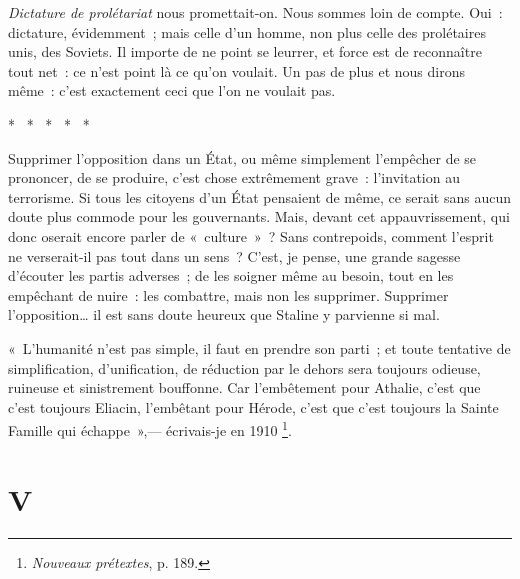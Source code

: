 \documentclass[french,twoside]{book} %
\begin{document}
\noindent \emph{Dictature de prolétariat} nous promettait-on. Nous sommes loin de compte. Oui : dictature, évidemment ; mais celle d’un homme, non plus celle des prolétaires unis, des Soviets. Il importe de ne point se leurrer, et force est de reconnaître tout net : ce n’est point là ce qu’on voulait. Un pas de plus et nous dirons même : c’est exactement ceci que l’on ne voulait pas.\par

\begin{center}
\noindent \centerline{*  *  *  *  *}\par
\end{center}

\noindent Supprimer l’opposition dans un État, ou même simplement l’empêcher de se prononcer, de se produire, c’est chose extrêmement grave : l’invitation au terrorisme. Si tous les citoyens d’un État pensaient de même, ce serait sans aucun doute plus commode pour les gouvernants. Mais, devant cet appauvrissement, qui donc oserait encore parler de « culture » ? Sans contrepoids, comment l’esprit ne verserait-il pas tout dans un sens ? C’est, je pense, une grande sagesse d’écouter les partis adverses ; de les soigner même au besoin, tout en les empêchant de nuire : les combattre, mais non les supprimer. Supprimer l’opposition… il est sans doute heureux que Staline y parvienne si mal.\par
« L’humanité n’est pas simple, il faut en prendre son parti ; et toute tentative de simplification, d’unification, de réduction par le dehors sera toujours odieuse, ruineuse et sinistrement bouffonne. Car l’embêtement pour Athalie, c’est que c’est toujours Eliacin, l’embêtant pour Hérode, c’est que c’est toujours la Sainte Famille qui échappe »,— écrivais-je en 1910 \footnote{\emph{Nouveaux prétextes}, p. 189.}.
\section[{V}]{V}\renewcommand{\leftmark}{V}
\end{document}
